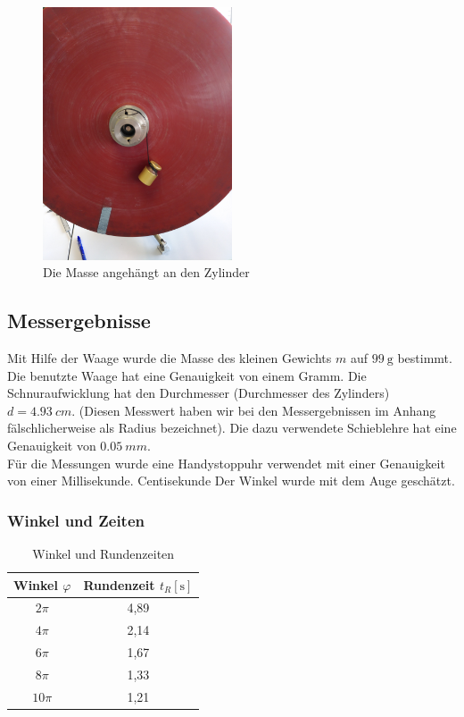 \documentclass{article}
\begin{document}
	\begin{figure}[!ht]
		\centering
		\includegraphics[width=0.5\textwidth]{Winkelbeschleunigung.jpg}
		\caption{\label{fig:Angehängte Masse}Die Masse angehängt an den Zylinder}
	\end{figure}

	\subsection{Messergebnisse}
	Mit Hilfe der Waage wurde die Masse des kleinen Gewichts \(m\) auf \(\SI{99}{\gram}\) bestimmt. \\
	Die benutzte Waage hat eine Genauigkeit von einem Gramm.
	Die Schnuraufwicklung hat den Durchmesser (Durchmesser des Zylinders) \(d = \SI{4.93}{cm}\). (Diesen Messwert haben wir bei den Messergebnissen im Anhang fälschlicherweise als Radius bezeichnet).
	Die dazu verwendete Schieblehre hat eine Genauigkeit von \(\SI{0.05}{mm}\). \\
	Für die Messungen wurde eine Handystoppuhr verwendet mit einer Genauigkeit von einer Millisekunde. {\Huge Centisekunde} %
	Der Winkel wurde mit dem Auge geschätzt. \\

	\subsubsection{Winkel und Zeiten}
	\begin{table}[!ht]
		\centering
		\begin{tabular}{ | c | c | }
			\hline
			Winkel \( \varphi \) & Rundenzeit \(t_R [\unit{\second}]\) \\
			\hline
			\( 2\pi \)           & 4,89 \\
			\( 4\pi \)           & 2,14 \\
			\( 6\pi \)           & 1,67 \\
			\( 8\pi \)           & 1,33 \\
			\( 10\pi \)          & 1,21 \\
			\hline
		\end{tabular}
		\caption{Winkel und Rundenzeiten}
	\end{table}
\end{document}
